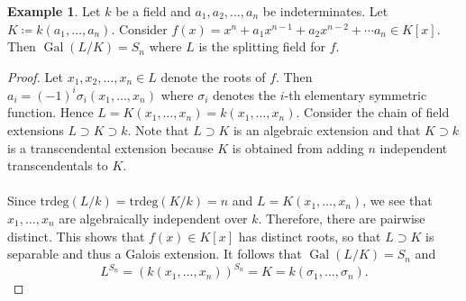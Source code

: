 \documentclass[10pt,letterpaper,cm]{nupset}
\theoremstyle{definition}
\newtheorem{exmp}{Example}
\newcommand{\1}{\mathbf{1}}
\newcommand{\0}{\vec 0}
\DeclareMathOperator{\gal}{Gal}
\begin{document}
\begin{exmp}
Let $k$ be a field and $a_1, a_2, \ldots, a_n$ be indeterminates.  Let $K\coloneqq  k(a_1, \ldots, a_n)$. Consider $f(x) = x^n + a_1x^{n-1} + a_2x^{n-2} + \cdots a_n \in K[x]$. Then $\gal(L/K) = S_n$ where $L$ is the splitting field for $f$.
\end{exmp}
\begin{proof}
Let $x_1, x_2, \ldots, x_n \in L$ denote the roots of $f$. Then $a_i = ({-}1)^i\sigma_i(x_1, \ldots, x_n)$ where $\sigma_i$ denotes the $i$-th elementary symmetric function. Hence $L = K(x_1, \ldots, x_n) = k(x_1, \ldots, x_n)$. Consider the chain of field extensions $L \supset K \supset k$. Note that $L \supset K$ is an algebraic extension and that $K \supset k$ is a transcendental extension because $K$ is obtained from adding $n$ independent transcendentals to $K$.
\\ \\ 
Since $\text{trdeg}(L/k) = \text{trdeg}(K/k) = n$ and $L = K(x_1, \ldots, x_n)$, we see that $x_1, \ldots, x_n$ are algebraically independent over $k$.  Therefore, there are pairwise distinct. This shows that $f(x) \in K[x]$ has distinct roots, so that $L\supset K$ is separable and thus a Galois extension. It follows that $\gal(L/K) = S_n$ and $$L^{S_n}= (k(x_1, \ldots, x_n))^{S_n}= K =k(\sigma_1, \ldots, \sigma_n).$$
\end{proof}
\end{document}

